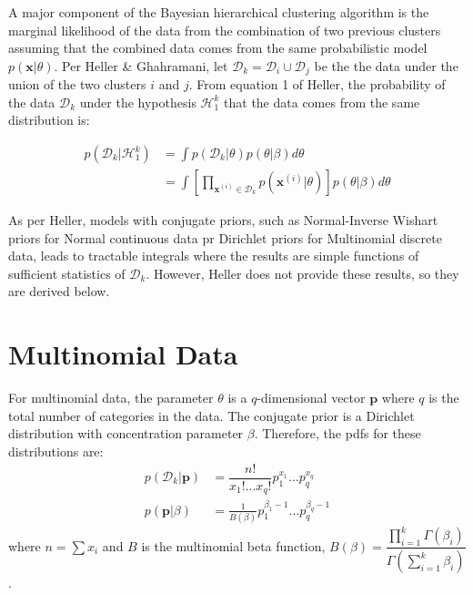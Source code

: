 \documentclass{article}
\begin{document}
A major component of the Bayesian hierarchical clustering algorithm is
the marginal likelihood of the data from the combination of two
previous clusters assuming that the combined data comes from the same
probabilistic model $p(\mathbf{x}|\theta)$.  Per Heller \& Ghahramani,
let $\mathcal{D}_k = \mathcal{D}_i \cup \mathcal{D}_j$ be the the
data under the union of the two clusters $i$ and $j$.  From equation 1
of Heller, the probability of the data $\mathcal{D}_k$ under the
hypothesis $\mathcal{H}_1^k$ that the data comes from the same
distribution is:

\begin{align*}
  p(\mathcal{D}_k | \mathcal{H}_1^k) &= \int p(\mathcal{D}_k | \theta) p(\theta | \beta) d\theta \\
    &= \int \left[ \prod_{\mathbf{x}^{(i)} \in \mathcal{D}_k} p(\mathbf{x}^{(i)}|\theta)\right] p(\theta|\beta)d\theta
\end{align*}

As per Heller, models with conjugate priors, such as Normal-Inverse
Wishart priors for Normal continuous data pr Dirichlet priors for
Multinomial discrete data, leads to tractable integrals where the
results are simple functions of sufficient statistics of
$\mathcal{D}_k$.  However, Heller does not provide these results, so
they are derived below.

\section{Multinomial Data}
For multinomial data, the parameter $\theta$ is a $q$-dimensional vector
$\mathbf{p}$ where $q$ is the total number of categories in the data.  The
conjugate prior is a Dirichlet distribution with concentration
parameter $\beta$.  Therefore, the pdfs for these distributions are:
\begin{align*}
  p(\mathcal{D}_k | \mathbf{p}) &= \dfrac{n!}{x_1! \dots x_q!}p_1^{x_1}\dots p_q^{x_q} \\
  p(\mathbf{p} | \beta) &= \frac{1}{B(\beta)}p_1^{\beta_1-1}\dots p_q^{\beta_q-1}
\end{align*}
where $n=\sum x_i$ and $B$ is the multinomial beta function, $B(\beta) =
\dfrac{\prod_{i=1}^k\Gamma(\beta_i)}{\Gamma(\sum_{i=1}^k \beta_i)}$.
\end{document}
